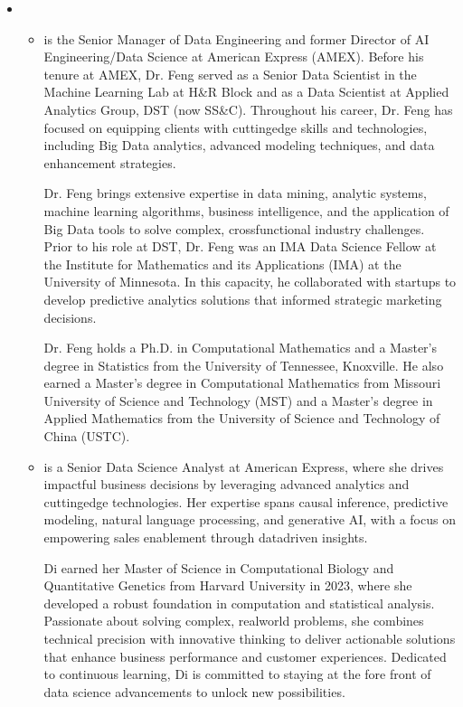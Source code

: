 \documentclass[letterpaper,11pt,english]{sphinxmanual}
\begin{document}
\begin{itemize}
\begin{itemize}
\begin{itemize}
\end{itemize}

\end{itemize}

\item {} 
\sphinxAtStartPar
{}
\begin{itemize}
\item {} 
\sphinxAtStartPar
{} is the Senior Manager of Data Engineering and former Director of
AI Engineering/Data Science at American Express (AMEX). Before his tenure at
AMEX, Dr. Feng served as a Senior Data Scientist in the Machine Learning Lab
at H\&R Block and as a Data Scientist at Applied Analytics Group, DST (now SS\&C).
Throughout his career, Dr. Feng has focused on equipping clients with cutting\sphinxhyphen{}edge
skills and technologies, including Big Data analytics, advanced modeling
techniques, and data enhancement strategies.

\sphinxAtStartPar
Dr. Feng brings extensive expertise in data mining, analytic systems, machine
learning algorithms, business intelligence, and the application of Big Data
tools to solve complex, cross\sphinxhyphen{}functional industry challenges. Prior to his
role at DST, Dr. Feng was an IMA Data Science Fellow at the Institute for
Mathematics and its Applications (IMA) at the University of Minnesota.
In this capacity, he collaborated with startups to develop predictive
analytics solutions that informed strategic marketing decisions.

\sphinxAtStartPar
Dr. Feng holds a Ph.D. in Computational Mathematics and a Master’s degree
in Statistics from the University of Tennessee, Knoxville. He also earned a
Master’s degree in Computational Mathematics from Missouri University
of Science and Technology (MST) and a Master’s degree in Applied
Mathematics from the University of Science and Technology of China (USTC).

\item {} 
\sphinxAtStartPar
{} is a Senior Data Science Analyst at American Express, where she
drives impactful business decisions by leveraging advanced analytics and
cutting\sphinxhyphen{}edge technologies. Her expertise spans causal inference, predictive
modeling, natural language processing, and generative AI, with a focus on
empowering sales enablement through data\sphinxhyphen{}driven insights.

\sphinxAtStartPar
Di earned her Master of Science in Computational Biology and Quantitative
Genetics from Harvard University in 2023, where she developed a robust
foundation in computation and statistical analysis. Passionate about
solving complex, real\sphinxhyphen{}world problems, she combines technical precision
with innovative thinking to deliver actionable solutions that enhance
business performance and customer experiences. Dedicated to continuous
learning, Di is committed to staying at the fore front of data science
advancements to unlock new possibilities.


\end{itemize}
\end{itemize}
\end{document}
